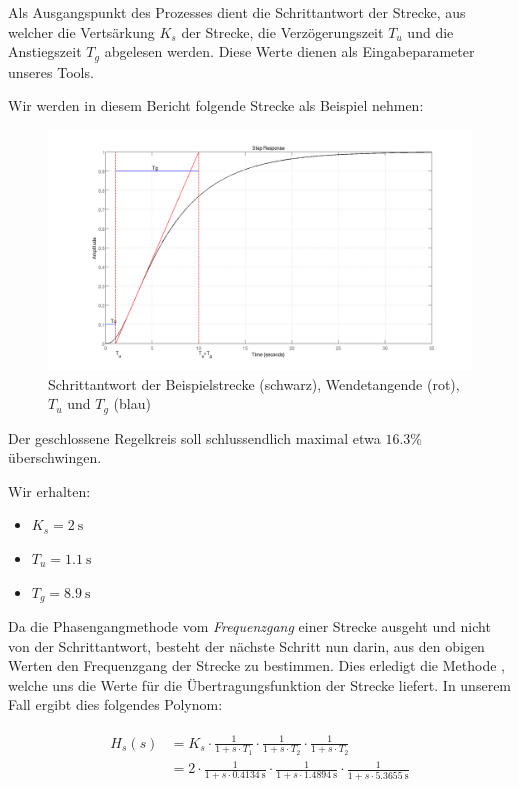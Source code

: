 Als  Ausgangspunkt  des  Prozesses   dient  die  Schrittantwort  der  Strecke,
aus  welcher  die  Verts\"arkung  $K_s$ der  Strecke,  die  Verz\"ogerungszeit
$T_u$  und die  Anstiegszeit $T_g$  abgelesen werden. Diese  Werte dienen  als
Eingabeparameter unseres Tools.

Wir werden in diesem Bericht folgende Strecke als Beispiel nehmen:
\begin{figure}[h! width=\pagewidth]
    \includegraphics[width=\textwidth]{images/streckeSchrittantwort.png}
    \caption{%
    Schrittantwort der  Beispielstrecke (schwarz), Wendetangende  (rot), $T_u$
    und $T_g$ (blau)%
    }
    \label{fig:plant_step}
\end{figure}

Der  geschlossene   Regelkreis  soll  schlussendlich  maximal   etwa  $16.3\%$
\"uberschwingen.

Wir erhalten:
\begin{itemize}
    \item
        $K_s = \SI{2}{\second}$
    \item
        $T_u = \SI{1.1}{\second}$
    \item
        $T_g = \SI{8.9}{\second}$
\end{itemize}

Da  die Phasengangmethode  vom \emph{Frequenzgang}  einer Strecke  ausgeht und
nicht von der Schrittantwort, besteht der n\"achste Schritt nun darin, aus den
obigen Werten  den Frequenzgang  der Strecke  zu bestimmen. Dies  erledigt die
Methode , welche uns  die Werte f\"ur die \"Ubertragungsfunktion
der  Strecke   liefert.     In  unserem  Fall  ergibt  dies  folgendes
Polynom:

\begin{gather} \label{eq:transfer:plant}
    \begin{split}
        H_s (s) & = K_s
                  \cdot \frac{1}{1 + s \cdot T_1}
                  \cdot \frac{1}{1 + s \cdot T_2}
                  \cdot \frac{1}{1 + s \cdot T_2}                     \\
                & = 2
                  \cdot \frac{1}{1 + s \cdot \SI{0.4134}{\second}}
                  \cdot \frac{1}{1 + s \cdot \SI{1.4894}{\second}}
                  \cdot \frac{1}{1 + s \cdot \SI{5.3655}{\second}}
    \end{split}
\end{gather}

